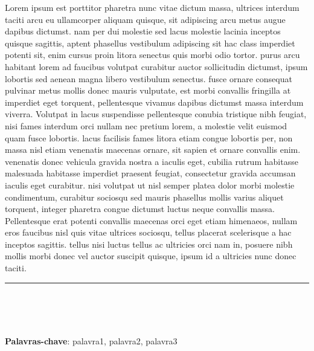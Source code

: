 \documentclass[12pt]{article}
\begin{document}
Lorem ipsum est porttitor pharetra nunc vitae dictum massa, ultrices interdum taciti arcu eu ullamcorper aliquam quisque, sit adipiscing arcu metus augue dapibus dictumst. nam per dui molestie sed lacus molestie lacinia inceptos quisque sagittis, aptent phasellus vestibulum adipiscing sit hac class imperdiet potenti sit, enim cursus proin litora senectus quis morbi odio tortor. purus arcu habitant lorem ad faucibus volutpat curabitur auctor sollicitudin dictumst, ipsum lobortis sed aenean magna libero vestibulum senectus. fusce ornare consequat pulvinar metus mollis donec mauris vulputate, est morbi convallis fringilla at imperdiet eget torquent, pellentesque vivamus dapibus dictumst massa interdum viverra. Volutpat in lacus suspendisse pellentesque conubia tristique nibh feugiat, nisi fames interdum orci nullam nec pretium lorem, a molestie velit euismod quam fusce lobortis. lacus facilisis fames litora etiam congue lobortis per, non massa nisl etiam venenatis maecenas ornare, sit sapien et ornare convallis enim. venenatis donec vehicula gravida nostra a iaculis eget, cubilia rutrum habitasse malesuada habitasse imperdiet praesent feugiat, consectetur gravida accumsan iaculis eget curabitur. nisi volutpat ut nisl semper platea dolor morbi molestie condimentum, curabitur sociosqu sed mauris phasellus mollis varius aliquet torquent, integer pharetra congue dictumst luctus neque convallis massa. Pellentesque erat potenti convallis maecenas orci eget etiam himenaeos, nullam eros faucibus nisl quis vitae ultrices sociosqu, tellus placerat scelerisque a hac inceptos sagittis. tellus nisi luctus tellus ac ultricies orci nam in, posuere nibh mollis morbi donec vel auctor suscipit quisque, ipsum id a ultricies nunc donec taciti. 
\\
\rule{5cm}{0.4mm} %
\\
\renewcommand{\footnotesize}{\smaller[2]} %
\author{
\\{\footnotesize 1 Estudante do Curso de ... do Laboratório de ... do Centro ...; E-mail: email@email.com}\\
{\footnotesize 2 Estudante do Curso de ... do Laboratório de ... do Centro ...; E-mail: email@email.com}\\
{\footnotesize 3 Estudante do Curso de ... do Laboratório de ... do Centro ...; E-mail: email@email.com}
}
\\
\\
\textbf{Palavras-chave}: palavra1, palavra2, palavra3
\pagebreak %
\end{document}
